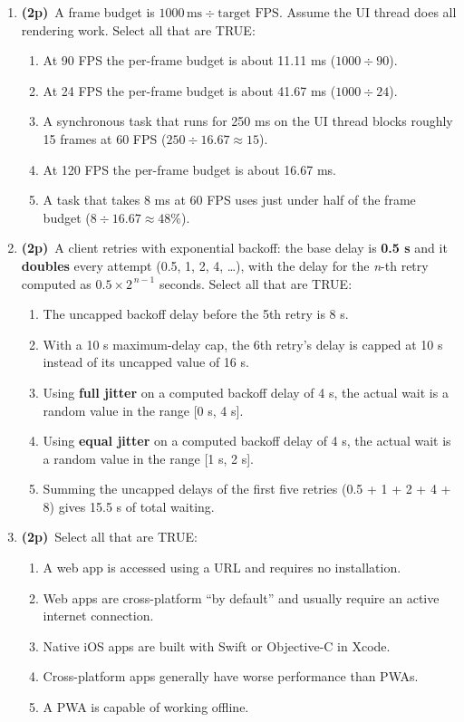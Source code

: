 \documentclass[11pt]{article}
\newcommand{\pts}{\textbf{(2p)}~}
\begin{document}
  \begin{enumerate}

    \item \pts A frame budget is $1000\,\text{ms} \div \text{target FPS}$. Assume the UI thread does all rendering work. Select all that are TRUE:
    \begin{enumerate}
      \item At 90 FPS the per-frame budget is about 11.11 ms ($1000 \div 90$).
      \item At 24 FPS the per-frame budget is about 41.67 ms ($1000 \div 24$).
      \item A synchronous task that runs for 250 ms on the UI thread blocks roughly 15 frames at 60 FPS ($250 \div 16.67 \approx 15$).
      \item At 120 FPS the per-frame budget is about 16.67 ms.
      \item A task that takes 8 ms at 60 FPS uses just under half of the frame budget ($8 \div 16.67 \approx 48\%$).
    \end{enumerate}

    \item \pts A client retries with exponential backoff: the base delay is \textbf{0.5 s} and it \textbf{doubles} every attempt (0.5, 1, 2, 4, \dots), with the delay for the \emph{n}-th retry computed as $0.5 \times 2^{\,n-1}$ seconds. Select all that are TRUE:
    \begin{enumerate}
      \item The uncapped backoff delay before the 5th retry is 8 s.
      \item With a 10 s maximum-delay cap, the 6th retry's delay is capped at 10 s instead of its uncapped value of 16 s.
      \item Using \textbf{full jitter} on a computed backoff delay of 4 s, the actual wait is a random value in the range [0 s, 4 s].
      \item Using \textbf{equal jitter} on a computed backoff delay of 4 s, the actual wait is a random value in the range [1 s, 2 s].
      \item Summing the uncapped delays of the first five retries (0.5 + 1 + 2 + 4 + 8) gives 15.5 s of total waiting.
    \end{enumerate}

    \item \pts Select all that are TRUE:
    \begin{enumerate}
      \item A web app is accessed using a URL and requires no installation.
      \item Web apps are cross-platform ``by default'' and usually require an active internet connection.
      \item Native iOS apps are built with Swift or Objective-C in Xcode.
      \item Cross-platform apps generally have worse performance than PWAs.
      \item A PWA is capable of working offline.
    \end{enumerate}


\end{enumerate}
\end{document}

